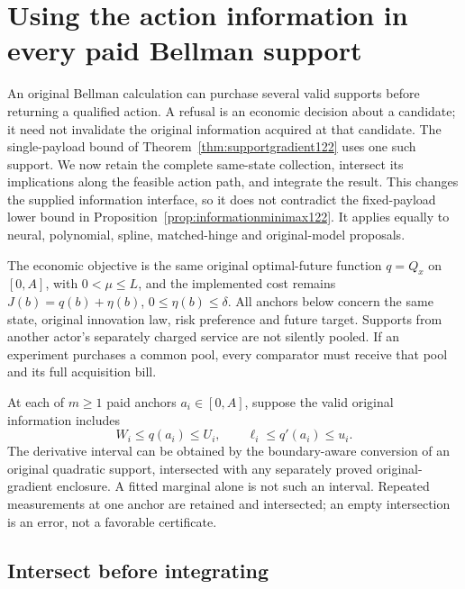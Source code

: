 \section{Using the action information in every paid Bellman support}
\label{sec:memory123}

An original Bellman calculation can purchase several valid supports before
returning a qualified action. A refusal is an economic decision about a
candidate; it need not invalidate the original information acquired at that
candidate. The single-payload bound of
Theorem~\ref{thm:supportgradient122} uses one such support. We now retain
the complete same-state collection, intersect its implications along the
feasible action path, and integrate the result. This changes the supplied
information interface, so it does not contradict the fixed-payload lower
bound in Proposition~\ref{prop:informationminimax122}. It applies equally
to neural, polynomial, spline, matched-hinge and original-model proposals.

The economic objective is the same original optimal-future function
$q=Q_x$ on $[0,A]$, with $0<\mu\le L$, and the implemented cost remains
$J(b)=q(b)+\eta(b)$, $0\le\eta(b)\le\delta$. All anchors below concern
the same state, original innovation law, risk preference and future target.
Supports from another actor's separately charged service are not silently
pooled. If an experiment purchases a common pool, every comparator must
receive that pool and its full acquisition bill.

At each of $m\ge1$ paid anchors $a_i\in[0,A]$, suppose the valid
original information includes
\begin{equation}\label{eq:memorydata123}
 W_i\le q(a_i)\le U_i,\qquad
 \ell_i\le q'(a_i)\le u_i.
\end{equation}
The derivative interval can be obtained by the boundary-aware conversion
of an original quadratic support, intersected with any separately proved
original-gradient enclosure. A fitted marginal alone is not such an
interval. Repeated measurements at one anchor are retained and
intersected; an empty intersection is an error, not a favorable certificate.

\subsection{Intersect before integrating}

